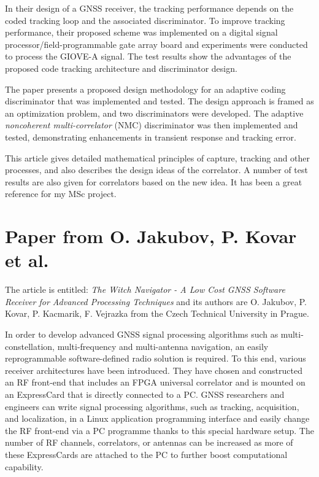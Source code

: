 In their design of a GNSS receiver, the tracking performance depends on the coded tracking loop and the associated discriminator. To improve tracking performance, their proposed scheme was implemented on a digital signal processor/field-programmable gate array board and experiments were conducted to process the GIOVE-A signal. The test results show the advantages of the proposed code tracking architecture and discriminator design.

The paper presents a proposed design methodology for an adaptive coding discriminator that was implemented and tested. The design approach is framed as an optimization problem, and two discriminators were developed. The adaptive \textit{noncoherent multi-correlator} (NMC) discriminator was then implemented and tested, demonstrating enhancements in transient response and tracking error.

This article gives detailed mathematical principles of capture, tracking and other processes, and also describes the design ideas of the correlator. A number of test results are also given for correlators based on the new idea. It has been a great reference for my MSc project.

\section{Paper from O. Jakubov, P. Kovar et al.\texorpdfstring{\cite{RN155}}{}}
The article is entitled: \textit{The Witch Navigator - A Low Cost GNSS Software Receiver for Advanced Processing Techniques} and its authors are O. Jakubov, P. Kovar, P. Kacmarik, F. Vejrazka from the Czech Technical University in Prague.

In order to develop advanced GNSS signal processing algorithms such as multi-constellation, multi-frequency and multi-antenna navigation, an easily reprogrammable software-defined radio solution is required. To this end, various receiver architectures have been introduced. They have chosen and constructed an RF front-end that includes an FPGA universal correlator and is mounted on an ExpressCard that is directly connected to a PC. GNSS researchers and engineers can write signal processing algorithms, such as tracking, acquisition, and localization, in a Linux application programming interface and easily change the RF front-end via a PC programme thanks to this special hardware setup. The number of RF channels, correlators, or antennas can be increased as more of these ExpressCards are attached to the PC to further boost computational capability.

